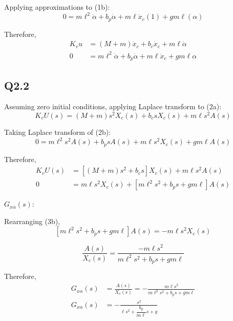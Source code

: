 \documentclass[11pt,a4paper]{article}
\begin{document}
Applying approximations to (1b):
\begin{equation*}
    0 = m\ell^{2}\ddot{\alpha} + b_{p}\dot{\alpha}
    + m\ell\ddot{x}_{c}(1) + gm\ell(\alpha)
\end{equation*}

Therefore,
\begin{align}
    K_{v}u &= \left( M+m \right)\ddot{x}_{c} + b_{c}\dot{x}_{c}
    + m\ell\ddot{\alpha} \tag{2a} \\
    0 &= m\ell^{2}\ddot{\alpha} + b_{p}\dot{\alpha}
    + m\ell\ddot{x}_{c} + gm\ell\alpha \tag{2b}
\end{align}

\subsection*{Q2.2}

Assuming zero initial conditions, applying Laplace transform to (2a):
\begin{equation*}
    K_{v} U(s) = \left( M + m \right) s^{2}X_{c}(s) + b_{c} s X_{c}(s)
    + m \ell s^{2} A(s)
\end{equation*}

Taking Laplace transform of (2b):
\begin{equation*}
    0 = m \ell^{2} s^{2} A(s) + b_{p} s A(s) + m \ell s^{2} X_{c}(s)
    + gm \ell A(s)
\end{equation*}

Therefore, 
\begin{align}
	K_{v} U(s) &= \left[ \left( M + m \right) s^{2} + b_{c} s \right] X_{c}(s)
	+ m \ell s^{2} A(s) \tag{3a} \\
	0 &= m \ell s^{2} X_{c}(s)
	+ \left[ m \ell^{2} s^{2} + b_{p} s + g m \ell \right] A(s) \tag{3b}
\end{align}

$G_{x\alpha}(s)$:

Rearranging (3b),
\begin{equation*}
    \left[ m \ell^{2} s^{2} + b_{p} s + g m \ell \right] A(s) =
    -m \ell s^{2} X_{c} (s)
\end{equation*}

\begin{equation*}
    \frac{A(s)}{X_{c}(s)} = 
	\frac{-m \ell s^{2}}{m \ell^{2} s^{2} + b_{p}s + g m \ell}
\end{equation*}

Therefore,
\begin{align}
    G_{x\alpha}(s) &= \frac{A(s)}{X_{c}(s)}
    = -\frac{m \ell s^{2}}{m \ell^{2} s^{2} + b_{p} s + g m \ell} \tag{4a} \\
    G_{x\alpha}(s) &= -\frac{s^{2}}{\ell s^{2} + \dfrac{b_{p}}{m \ell}s + g} 
	\tag{4b}
\end{align}
\end{document}
